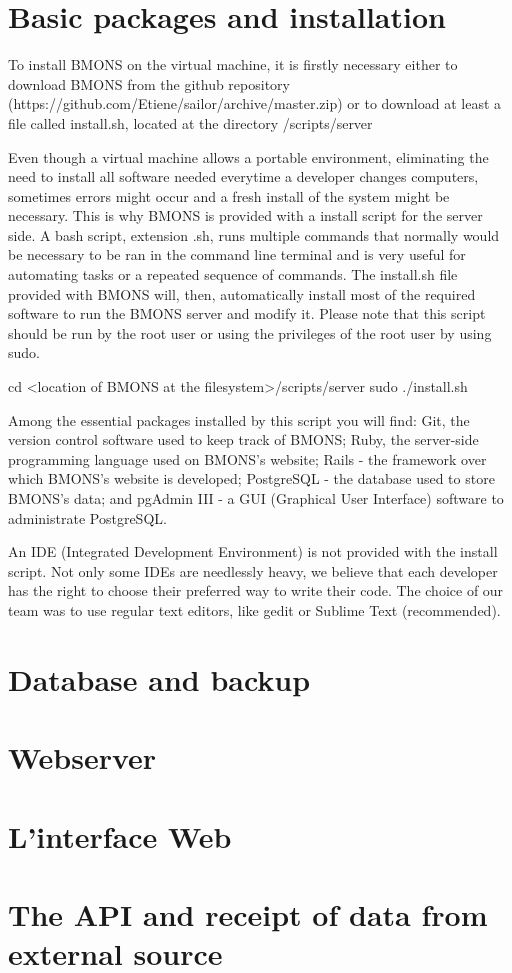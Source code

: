 \section{Basic packages and installation}

To install BMONS on the virtual machine, it is firstly necessary either to download BMONS from the github repository (https://github.com/Etiene/sailor/archive/master.zip)
or to download at least a file called install.sh, located at the directory /scripts/server

Even though a virtual machine allows a portable environment, eliminating the need to install all software needed everytime a developer changes computers, sometimes errors might occur and a fresh install of the system might be necessary. This is why BMONS is provided with a install script for the server side. A bash script, extension .sh, runs multiple commands that normally would be necessary to be ran in the command line terminal and is very useful for automating tasks or a repeated sequence of commands. The install.sh file provided with BMONS will, then, automatically install most of the required software to run the BMONS server and modify it. Please note that this script should be run by the root user or using the privileges of the root user by using sudo.

cd <location of BMONS at the filesystem>/scripts/server
sudo ./install.sh

Among the essential packages installed by this script you will find: Git, the version control software used to keep track of BMONS; Ruby, the server-side programming language used on BMONS's website; Rails - the framework over which BMONS's website is developed; PostgreSQL - the database used to store BMONS's data; and pgAdmin III - a GUI (Graphical User Interface) software to administrate PostgreSQL.

An IDE (Integrated Development Environment) is not provided with the install script. Not only some IDEs are needlessly heavy, we believe that each developer has the right to choose their preferred way to write their code. The choice of our team was to use regular text editors, like gedit or Sublime Text (recommended).

\section{Database and backup}



\section{Webserver}

\section{L'interface Web}

\section{The API and receipt of data from external source}

